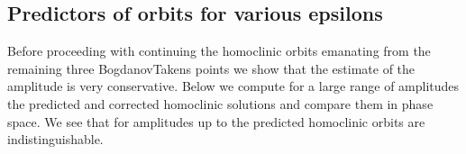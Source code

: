 \documentclass[letterpaper,10pt,english]{jupyterBook}
\begin{document}
\noindent{}


\subsection{Predictors of orbits for various epsilons}
\label{\detokenize{HomoclinicRGflows:predictors-of-orbits-for-various-epsilons}}
\sphinxAtStartPar
Before proceeding with continuing the homoclinic orbits emanating from the
remaining three Bogdanov\sphinxhyphen{}Takens points we show that the estimate of the
amplitude is very conservative. Below we compute for a large range of
amplitudes the predicted and corrected homoclinic solutions and compare them in
phase space. We see that for amplitudes up to  the predicted
homoclinic orbits are indistinguishable.
\end{document}
